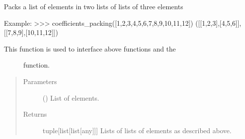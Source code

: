 \documentclass[letterpaper,10pt,english]{sphinxmanual}
\begin{document}
\begin{fulllineitems}
\label{\detokenize{mermin_eval:mermin_eval.coefficients_packing}}
Packs a list of elements in two lists of lists of three elements

Example:
\textgreater{}\textgreater{}\textgreater{}  coefficients\_packing({[}1,2,3,4,5,6,7,8,9,10,11,12{]})
({[}{[}1,2,3{]},{[}4,5,6{]}{]},{[}{[}7,8,9{]},{[}10,11,12{]}{]})
\begin{description}
\item[{This function is used to interface above  functions and the }] \leavevmode
{} function.

\end{description}
\begin{quote}\begin{description}
\item[{Parameters}] \leavevmode
{} (\sphinxstyleliteralemphasis{\sphinxupquote{{[}}}\sphinxstyleliteralemphasis{\sphinxupquote{{]}}}) \textendash{} List of elements.

\item[{Returns}] \leavevmode
tuple{[}list{[}list{[}any{]}{]}{]} \textendash{} Lists of lists of elements as described 
above.

\end{description}\end{quote}

\end{fulllineitems}

\end{document}
